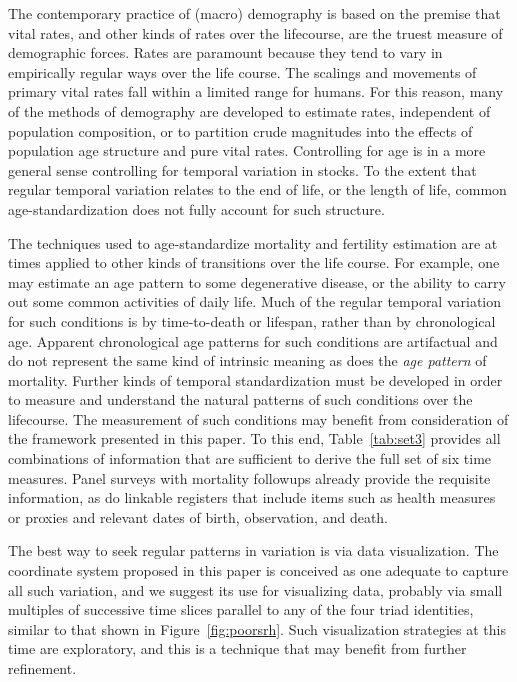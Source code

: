 \documentclass[12pt,oneside,a4paper]{article} %
\begin{document}
The contemporary practice of (macro) demography is based on the premise that
vital rates, and other kinds of rates over the lifecourse, are the truest measure of
demographic forces. Rates are paramount because they tend to vary in
empirically regular ways over the life course. The scalings and movements of
primary vital rates fall within a limited range for humans. For this reason, many of the methods of
demography are developed to estimate rates, independent of population composition, or to
partition crude magnitudes into the effects of population age structure and
pure vital rates. Controlling for age is in a more general sense controlling for
temporal variation in stocks. To the extent that regular temporal variation
relates to the end of life, or the length of life, common
age-standardization does not fully account for such structure.

The techniques used to age-standardize mortality and fertility estimation are at
times applied to other kinds of transitions over the life course. For example,
one may estimate an age pattern to some degenerative disease, or the
ability to carry out some common activities of daily life. Much of the
regular temporal variation for such conditions is by time-to-death or
lifespan, rather than by chronological age. Apparent chronological age patterns
for such conditions are artifactual and do not represent the same kind of
intrinsic meaning as does the \textit{age pattern} of mortality. Further kinds
of temporal standardization must be developed in order to measure and understand
the natural patterns of such conditions over the lifecourse. 
The measurement of
such conditions may benefit from consideration of the framework presented in
this paper. To this end, Table~\ref{tab:set3} provides all combinations of
information that are sufficient to derive the full set of six time measures.
Panel surveys with mortality followups already provide the requisite
information, as do linkable registers that include items such as
health measures or proxies and relevant dates of birth, observation, and death.

The best way to seek regular patterns in variation
is via data visualization. The coordinate system proposed in this paper is
conceived as one adequate to capture all such variation, and we suggest its use
for visualizing data, probably via small multiples of successive time slices
parallel to any of the four triad identities, similar to that shown in
Figure~\ref{fig:poorsrh}.
Such visualization strategies at this time are exploratory, and this is a
technique that may benefit from further refinement. 
\end{document}
